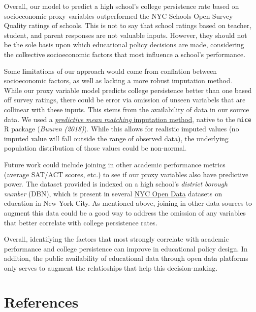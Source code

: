 \documentclass[
  man,floatsintext]{apa6}
\begin{document}
Overall, our model to predict a high school's college persistence rate based on socioeconomic proxy variables outperformed the NYC Schools Open Survey Quality ratings of schools. This is not to say that school ratings based on teacher, student, and parent responses are not valuable inputs. However, they should not be the sole basis upon which educational policy decisions are made, considering the colkective socioeconomic factors that most influence a school's performance.

Some limitations of our approach would come from conflation between socioeconomic factors, as well as lacking a more robust imputation method. While our proxy variable model predicts college persistence better than one based off survey ratings, there could be error via omission of unseen variabels that are collinear with these inputs. This stems from the availability of data in our source data. We used a \href{https://stefvanbuuren.name/fimd/sec-pmm.html}{\emph{predictive mean matching} imputation method}, native to the \texttt{mice} R package (\emph{Buuren (2018)}). While this allows for realistic imputed values (no imputed value will fall outside the range of observed data), the underlying population distribution of those values could be non-normal.

Future work could include joining in other academic performance metrics (average SAT/ACT scores, etc.) to see if our proxy variables also have predictive power. The dataset provided is indexed on a high school's \emph{district borough number} (DBN), which is present in several \href{https://opendata.cityofnewyork.us}{NYC Open Data} datasets on education in New York City. As mentioned above, joining in other data sources to augment this data could be a good way to address the omission of any variables that better correlate with college persistence rates.

Overall, identifying the factors that most strongly correlate with academic performance and college persistence can improve in educational policy design. In addition, the public availability of educational data through open data platforms only serves to augment the relatioships that help this decision-making.

\newpage

\hypertarget{references}{%
\section{References}\label{references}}
\end{document}
